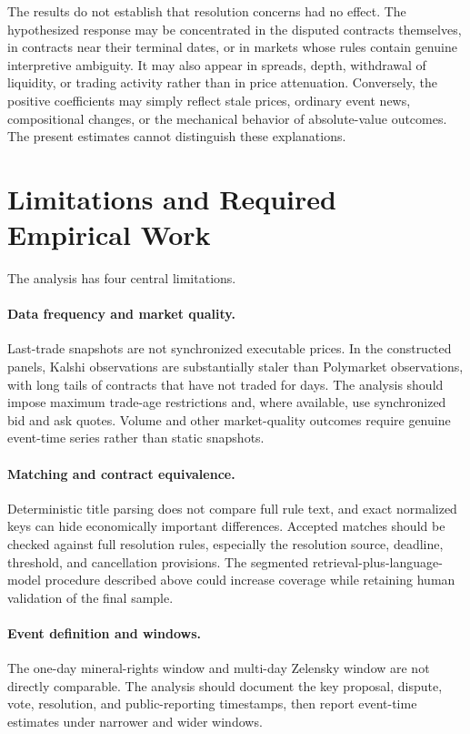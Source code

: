 \documentclass[11pt]{article}
\begin{document}
The results do not establish that resolution concerns had no effect. The hypothesized
response may be concentrated in the disputed contracts themselves, in contracts near their
terminal dates, or in markets whose rules contain genuine interpretive ambiguity. It may
also appear in spreads, depth, withdrawal of liquidity, or trading activity rather than in
price attenuation. Conversely, the positive coefficients may simply reflect stale prices,
ordinary event news, compositional changes, or the mechanical behavior of absolute-value
outcomes. The present estimates cannot distinguish these explanations.

\section{Limitations and Required Empirical Work}

The analysis has four central limitations.

\paragraph{Data frequency and market quality.}
Last-trade snapshots are not synchronized executable prices. In the constructed panels,
Kalshi observations are substantially staler than Polymarket observations, with long tails
of contracts that have not traded for days. The analysis should impose maximum trade-age
restrictions and, where available, use synchronized bid and ask quotes. Volume and other
market-quality outcomes require genuine event-time series rather than static snapshots.

\paragraph{Matching and contract equivalence.}
Deterministic title parsing does not compare full rule text, and exact normalized keys can
hide economically important differences. Accepted matches should be checked against full
resolution rules, especially the resolution source, deadline, threshold, and cancellation
provisions. The segmented retrieval-plus-language-model procedure described above could
increase coverage while retaining human validation of the final sample.

\paragraph{Event definition and windows.}
The one-day mineral-rights window and multi-day Zelensky window are not directly comparable.
The analysis should document the key proposal, dispute, vote, resolution, and public-reporting
timestamps, then report event-time estimates under narrower and wider windows.
\end{document}
